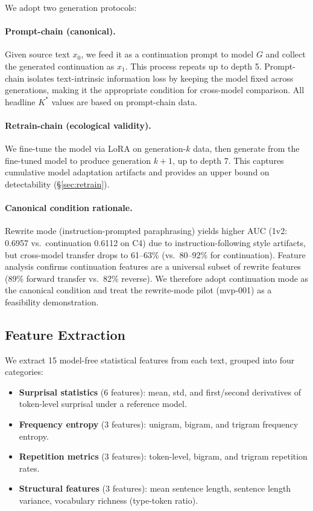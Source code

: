 \documentclass[11pt,a4paper]{article}
\begin{document}
We adopt two generation protocols:

\paragraph{Prompt-chain (canonical).} Given source text $x_0$, we feed it as a continuation prompt to model $G$ and collect the generated continuation as $x_1$. This process repeats up to depth 5. Prompt-chain isolates text-intrinsic information loss by keeping the model fixed across generations, making it the appropriate condition for cross-model comparison. All headline $K^*$ values are based on prompt-chain data.

\paragraph{Retrain-chain (ecological validity).} We fine-tune the model via LoRA on generation-$k$ data, then generate from the fine-tuned model to produce generation $k\!+\!1$, up to depth 7. This captures cumulative model adaptation artifacts and provides an upper bound on detectability (\S\ref{sec:retrain}).

\paragraph{Canonical condition rationale.} Rewrite mode (instruction-prompted paraphrasing) yields higher AUC (1v2: 0.6957 vs.\ continuation 0.6112 on C4) due to instruction-following style artifacts, but cross-model transfer drops to 61--63\% (vs.\ 80--92\% for continuation). Feature analysis confirms continuation features are a universal subset of rewrite features (89\% forward transfer vs.\ 82\% reverse). We therefore adopt continuation mode as the canonical condition and treat the rewrite-mode pilot (mvp-001) as a feasibility demonstration.

\subsection{Feature Extraction}

We extract 15 model-free statistical features from each text, grouped into four categories:

\begin{itemize}
    \item \textbf{Surprisal statistics} (6 features): mean, std, and first/second derivatives of token-level surprisal under a reference model.
    \item \textbf{Frequency entropy} (3 features): unigram, bigram, and trigram frequency entropy.
    \item \textbf{Repetition metrics} (3 features): token-level, bigram, and trigram repetition rates.
    \item \textbf{Structural features} (3 features): mean sentence length, sentence length variance, vocabulary richness (type-token ratio).
\end{itemize}
\end{document}
